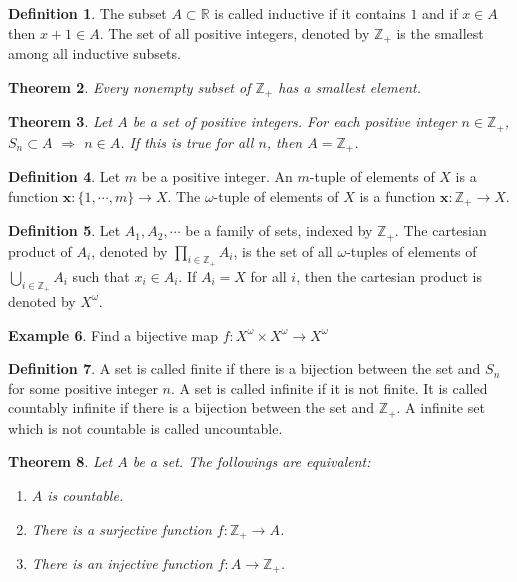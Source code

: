 \documentclass{beamer}
\theoremstyle{plain}
\newtheorem{thm}{Theorem}[section]
\theoremstyle{definition}
\newtheorem{defn}[thm]{Definition}
\newtheorem{exmp}[thm]{Example}
\begin{document}
\begin{frame}
\begin{defn}
	The subset $A\subset\mathbb R$ is called 
	inductive if it contains $1$ and 
	if $x\in A$ then $x+1\in A$.
	The set of all positive integers, denoted by 
	$\mathbb Z_+$ is the smallest among all 
	inductive subsets.
\end{defn}
\begin{thm}
	Every nonempty subset of $\mathbb Z_+$ has 
	a smallest element.
\end{thm}
\begin{thm}
	Let $A$ be a set of positive integers.
	For each positive integer $n\in\mathbb Z_+$,
	$S_n\subset A$ $\Rightarrow$ $n\in A$.
	If this is true for all $n$, 
	then $A=\mathbb Z_+$.
\end{thm}
\end{frame}

\begin{frame}
\begin{defn}
	Let $m$ be a positive integer.
	An $m$-tuple of elements of $X$ is a function
	$\mathbf x:\{1,\cdots,m\}\to X$.
	The $\omega$-tuple of elements of $X$ is
	a function $\mathbf x:\mathbb Z_+\to X$.
\end{defn}
\begin{defn}
	Let $A_1,A_2,\cdots$ be a family of sets,
	indexed by $\mathbb Z_+$.
	The cartesian product of $A_i$, denoted by 
	$\displaystyle\prod_{i\in\mathbb Z_+}A_i$,
	is the set of all $\omega$-tuples of elements of 
	$\displaystyle\bigcup_{i\in\mathbb Z_+}A_i$ 
	such that $x_i\in A_i$.
	If $A_i=X$ for all $i$, then the cartesian
	product is denoted by $X^\omega$.
\end{defn}
\begin{exmp}
Find a bijective map $f:X^\omega\times X^\omega\to
X^\omega$
\end{exmp}
\end{frame}

\begin{frame}
\begin{defn}
	A set is called finite if there 
	is a bijection between the set and $S_n$ 
	for some positive integer $n$.
	A set is called infinite if it is not finite.
	It is called countably infinite if there is
	a bijection between the set and $\mathbb Z_+$.
	A infinite set which is not countable
	is called uncountable.
\end{defn}
\begin{thm}
	Let $A$ be a set. The followings are equivalent:
	\begin{enumerate}
		\item $A$ is countable.
		\item There is a surjective function 
		$f:\mathbb Z_+\to A$.
		\item There is an injective function
		$f:A\to\mathbb Z_+$. 
	\end{enumerate}
\end{thm}
\end{frame}
\end{document}
